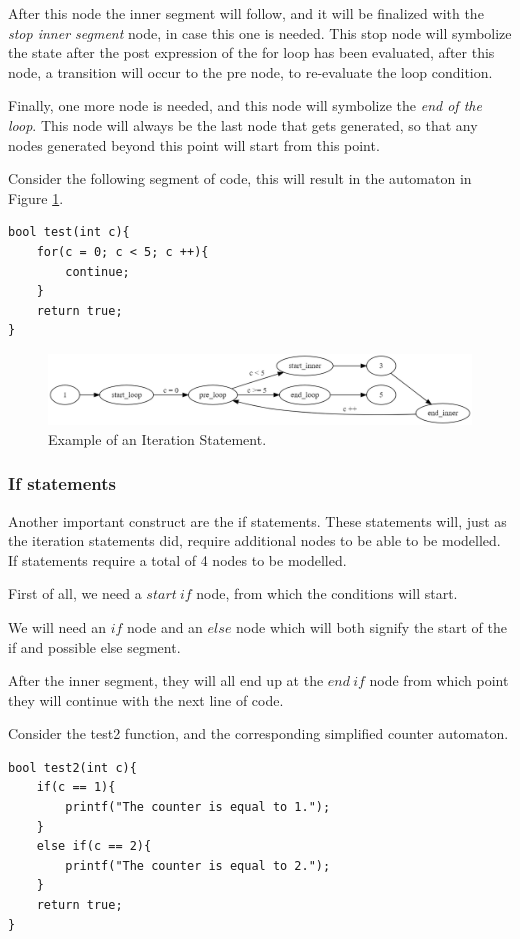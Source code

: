 \documentclass[12pt]{article}
\begin{document}
After this node the inner segment will follow, and it will be finalized with the \textit{stop inner segment} node, in case this one is needed. This stop node will symbolize the state after the post expression of the for loop has been evaluated, after this node, a transition will occur to the pre node, to re-evaluate the loop condition.

Finally, one more node is needed, and this node will symbolize the \textit{end of the loop}. This node will always be the last node that gets generated, so that any nodes generated beyond this point will start from this point.

Consider the following segment of code, this will result in the automaton in Figure \ref{fig:test_counter_automaton}.
\begin{lstlisting}[style=CStyle]
bool test(int c){
	for(c = 0; c < 5; c ++){
		continue;
	}
	return true;
}
\end{lstlisting}

\begin{figure}[h]
	\centering
	\includegraphics[width=0.95\linewidth]{test_counter_automaton}
	\caption{Example of an Iteration Statement.}
	\label{fig:test_counter_automaton}
\end{figure}

\subsubsection{If statements}
\label{sec:if}
Another important construct are the if statements. These statements will, just as the iteration statements did, require additional nodes to be able to be modelled. If statements require a total of 4 nodes to be modelled.

First of all, we need a $start\ if$ node, from which the conditions will start.

We will need an $if$ node and an $else$ node which will both signify the start of the if and possible else segment.

After the inner segment, they will all end up at the $end\ if$ node from which point they will continue with the next line of code.

Consider the test2 function, and the corresponding simplified counter automaton.
\begin{lstlisting}[style=CStyle]
bool test2(int c){
	if(c == 1){
		printf("The counter is equal to 1.");
	}
	else if(c == 2){
		printf("The counter is equal to 2.");
	}
	return true;
}
\end{lstlisting}
\end{document}
